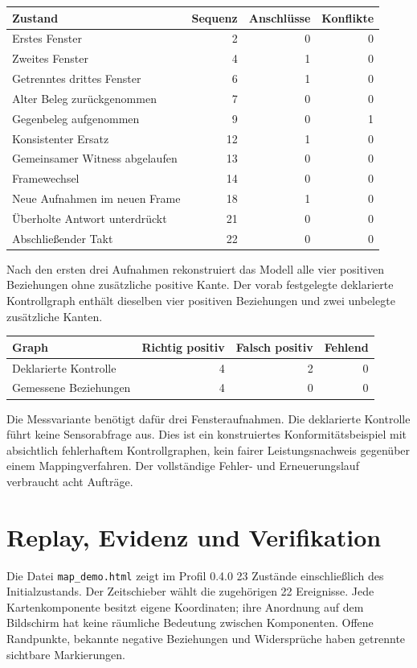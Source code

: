 \documentclass[11pt,a4paper]{article}
\newcommand{\nextsection}[2]{\clearpage{\color{accent}\small\textsf{#1}}\section{#2}}
\begin{document}
\begin{center}\begin{tabular}{@{}lrrr@{}}\toprule
Zustand & Sequenz & Anschlüsse & Konflikte\\\midrule
Erstes Fenster & 2 & 0 & 0\\
Zweites Fenster & 4 & 1 & 0\\
Getrenntes drittes Fenster & 6 & 1 & 0\\
Alter Beleg zurückgenommen & 7 & 0 & 0\\
Gegenbeleg aufgenommen & 9 & 0 & 1\\
Konsistenter Ersatz & 12 & 1 & 0\\
Gemeinsamer Witness abgelaufen & 13 & 0 & 0\\
Framewechsel & 14 & 0 & 0\\
Neue Aufnahmen im neuen Frame & 18 & 1 & 0\\
Überholte Antwort unterdrückt & 21 & 0 & 0\\
Abschließender Takt & 22 & 0 & 0\\\bottomrule
\end{tabular}\end{center}

Nach den ersten drei Aufnahmen rekonstruiert das Modell alle vier
positiven Beziehungen ohne zusätzliche positive Kante. Der vorab
festgelegte deklarierte Kontrollgraph enthält dieselben vier positiven
Beziehungen und zwei unbelegte zusätzliche Kanten.
\begin{center}\begin{tabular}{@{}lrrr@{}}\toprule
Graph & Richtig positiv & Falsch positiv & Fehlend\\\midrule
Deklarierte Kontrolle & 4 & 2 & 0\\
Gemessene Beziehungen & 4 & 0 & 0\\\bottomrule
\end{tabular}\end{center}
Die Messvariante benötigt dafür drei Fensteraufnahmen. Die deklarierte
Kontrolle führt keine Sensorabfrage aus. Dies ist ein konstruiertes
Konformitätsbeispiel mit absichtlich fehlerhaftem Kontrollgraphen,
kein fairer Leistungsnachweis gegenüber einem Mappingverfahren.
Der vollständige Fehler- und Erneuerungslauf verbraucht acht Aufträge.

\nextsection{33 / SECOND-LAYER-ANSICHT}{Replay, Evidenz und Verifikation}
Die Datei \texttt{map\_demo.html} zeigt im Profil 0.4.0 23 Zustände einschließlich des
Initialzustands. Der Zeitschieber wählt die zugehörigen 22 Ereignisse.
Jede Kartenkomponente besitzt eigene Koordinaten; ihre Anordnung
auf dem Bildschirm hat keine räumliche Bedeutung zwischen Komponenten.
Offene Randpunkte, bekannte negative Beziehungen und Widersprüche
haben getrennte sichtbare Markierungen.
\end{document}
